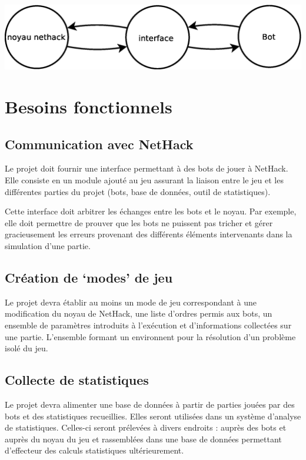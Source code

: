 \documentclass[12pt]{article}
\begin{document}
\begin{center}
  \includegraphics[width=180mm]{diagrammes/proto_archi.eps}
\end{center}


\section{Besoins fonctionnels}

\subsection{Communication avec NetHack}

Le projet doit fournir une interface permettant à des bots de jouer à NetHack. Elle consiste en un module ajouté au jeu assurant la liaison entre le jeu et les différentes parties du projet (bots, base de données, outil de statistiques).

Cette interface doit arbitrer les échanges entre les bots et le noyau. Par exemple, elle doit permettre de prouver que les bots ne puissent pas tricher et gérer gracieusement les erreurs provenant des différents éléments intervenants dans la simulation d'une partie.

\subsection{Création de `modes' de jeu}

Le projet devra établir au moins un mode de jeu correspondant à une modification du noyau de NetHack, une liste d'ordres permis aux bots, un ensemble de paramètres introduits à l'exécution et d'informations collectées sur une partie. L'ensemble formant un environnent pour la résolution d'un problème isolé du jeu.

\subsection{Collecte de statistiques}

Le projet devra alimenter une base de données à partir de parties jouées par des bots et des statistiques recueillies. Elles seront utilisées dans un système d'analyse de statistiques. Celles-ci seront prélevées à divers endroits : auprès des bots et auprès du noyau du jeu et rassemblées dans une base de données permettant d'effecteur des calculs statistiques ultérieurement.
\end{document}

